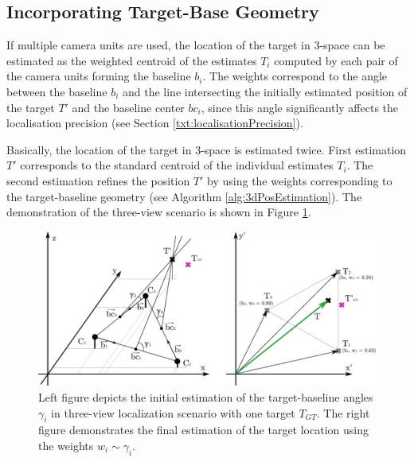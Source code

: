 \subsection{Incorporating Target-Base Geometry} \label{txt:incorporating_target-base_geometry}

If multiple camera units are used, the location of the target in 3-space can be estimated as the weighted centroid of the estimates $T_{i}$ computed by each pair of the camera units forming the baseline $b_{i}$. The weights correspond to the angle between the baseline $b_{i}$ and the line intersecting the initially estimated position of the target $T'$ and the baseline center $bc_{i}$, since this angle significantly affects the localisation precision (see Section \ref{txt:localisationPrecision}).

Basically, the location of the target in 3-space is estimated twice. First estimation $T'$ corresponds to the standard centroid of the individual estimates $T_{i}$. The second estimation refines the position $T'$ by using the weights corresponding to the target-baseline geometry (see Algorithm \ref{alg:3dPosEstimation}). The demonstration of the three-view scenario is shown in Figure \ref{fig:target-base_and_weighted_centroid}.

\begin{figure}[htb]\centering
	\centering
	\includegraphics[width=0.8\linewidth]{fig/target-base_and_weighted_centroid.pdf}
	\caption{Left figure depicts the initial estimation of the target-baseline angles $\gamma_{i}$ in three-view localization scenario with one target $T_{GT}$. The right figure demonstrates the final estimation of the target location using the weights $w_{i} \sim \gamma_{i}$.}
	\label{fig:target-base_and_weighted_centroid}
\end{figure}

